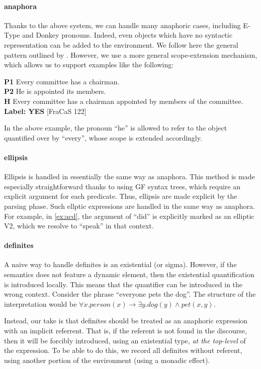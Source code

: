 \documentclass[11pt]{article}
\begin{document}
\paragraph{anaphora} Thanks to the above system, we can handle many
anaphoric cases, including E-Type and Donkey pronouns. Indeed, even
objects which have no syntactic representation can be added to the
environment. We follow here the general pattern outlined by
\citet{unger:2011}. However, we use a more general scope-extension
mechanism, which allows us to support examples like  the following:
\begin{lingex}
\item
    \label{ex:anaphora-scope}
\textbf{P1}	Every committee has a chairman.\\
\textbf{P2}	He is appointed its members.\\
\textbf{H} 	Every committee has a chairman appointed by members of the committee. \\ \textbf{Label:	YES} [FraCaS 122]
\end{lingex}
In the above example, the pronoun ``he'' is allowed to refer to the
object quantified over by ``every'', whose scope is extended
accordingly.

\paragraph{ellipsis} Ellipsis is handled in essentially the same way
as anaphora. This method is made especially straightforward thanks to
using GF syntax trees, which require an explicit argument for each
predicate. Thus, ellipsis are made explicit by the parsing phase. Such
ellptic expressions are handled in the same way as anaphora.
%
For example, in \ref{ex:acd}, the argument of ``did'' is
explicitly marked as an elliptic V2, which we resolve to ``speak'' in
that context.

\paragraph{definites} A naive way to handle definites is an
existential (or sigma). However, if the semantics does not feature a
dynamic element, then the existential quantification is introduced
locally. This means that the quantifier can be introduced in the wrong
context. Consider the phrase ``everyone pets the dog''. The structure
of the interpretation would be
$∀x. person(x) → ∃y. dog(y) ∧ pet(x,y)$.

Instead, our take is that definites should be treated as an anaphoric
expression with an implicit referrent. That is, if the referent is not
found in the discourse, then it will be forcibly introduced, using an
existential type, \emph{at the top-level} of the expression. To be
able to do this, we record all definites without referent, using
another portion of the environment (using a monadic effect).
\end{document}
